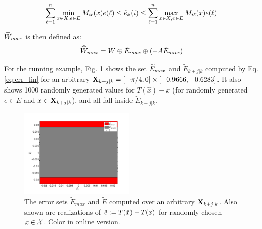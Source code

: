 \begin{equation*}
\label{eq:EtildeMax}
\sum_{\ell=1}^{n} \min_{x \in X, e \in E} M_{i\ell}(x)e(\ell)  \leq \tilde{e}_{k}(i)  \leq \sum_{\ell=1}^{n} \max_{x \in X, e \in E} M_{i\ell}(x)e(\ell)
\end{equation*}

$\widehat{W}_{max}$ is then defined as:
\begin{equation}
\widehat{W}_{max} = W \oplus \tilde{E}_{max} \oplus (-A\tilde{E}_{max})
\end{equation}

For the running example, Fig. \ref{fig:err_bound_toy} shows the set $\widetilde{E}_{max}$ and $\tilde{E}_{k+j|k}$ computed by Eq. \ref{eq:err_lin} for an arbitrary  $\mathbf{X}_{k+j|k} =  [-\pi/4,0]\times[-0.9666,-0.6283]$. It also shows 1000 randomly generated values for $T(\hat{x})-x$ (for randomly generated $e \in E$ and $x \in \mathbf{X}_{k+j|k}$), and all fall inside $\tilde{E}_{k+j|k}$.


\begin{figure}
	\includegraphics[angle=0,width=0.49\textwidth]{figs/Err_Bounds_toy.pdf}
	\caption{The error sets $\tilde{E}_{max}$ and $\tilde{E}$ computed over an arbitrary $\mathbf{X}_{k+j|k}$. Also shown are realizations of $\tilde{e} := T(\hat{x}) - T(x)$ for randomly chosen $x \in \mathcal{X}$. Color in online version.}
	\label{fig:err_bound_toy}
\end{figure}


